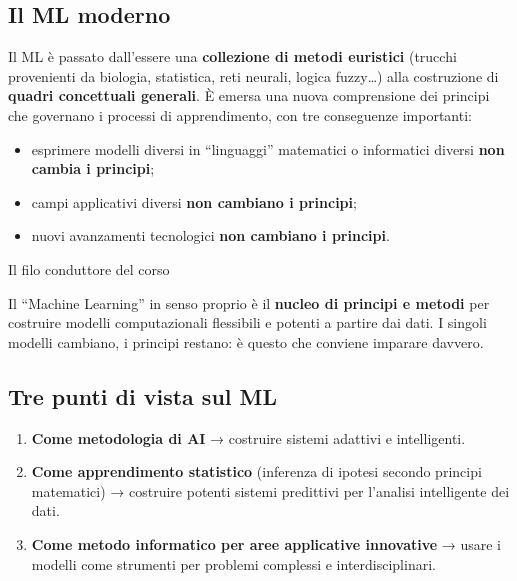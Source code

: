 \subsection{Il ML moderno}\label{il-ml-moderno}

Il ML è passato dall'essere una \textbf{collezione di metodi euristici}
(trucchi provenienti da biologia, statistica, reti neurali, logica
fuzzy\ldots) alla costruzione di \textbf{quadri concettuali generali}. È
emersa una nuova comprensione dei principi che governano i processi di
apprendimento, con tre conseguenze importanti:

\begin{itemize}
\tightlist
\item
  esprimere modelli diversi in ``linguaggi'' matematici o informatici
  diversi \textbf{non cambia i principi};
\item
  campi applicativi diversi \textbf{non cambiano i principi};
\item
  nuovi avanzamenti tecnologici \textbf{non cambiano i principi}.
\end{itemize}

\begin{boxtip}{Il filo conduttore del corso}

Il ``Machine Learning'' in senso proprio è il \textbf{nucleo di principi
e metodi} per costruire modelli computazionali flessibili e potenti a
partire dai dati. I singoli modelli cambiano, i principi restano: è
questo che conviene imparare davvero.

\end{boxtip}

\subsection{Tre punti di vista sul ML}\label{tre-punti-di-vista-sul-ml}

\begin{enumerate}
\def\labelenumi{\arabic{enumi}.}
\tightlist
\item
  \textbf{Come metodologia di AI} → costruire sistemi adattivi e
  intelligenti.
\item
  \textbf{Come apprendimento statistico} (inferenza di ipotesi secondo
  principi matematici) → costruire potenti sistemi predittivi per
  l'analisi intelligente dei dati.
\item
  \textbf{Come metodo informatico per aree applicative innovative} →
  usare i modelli come strumenti per problemi complessi e
  interdisciplinari.
\end{enumerate}


